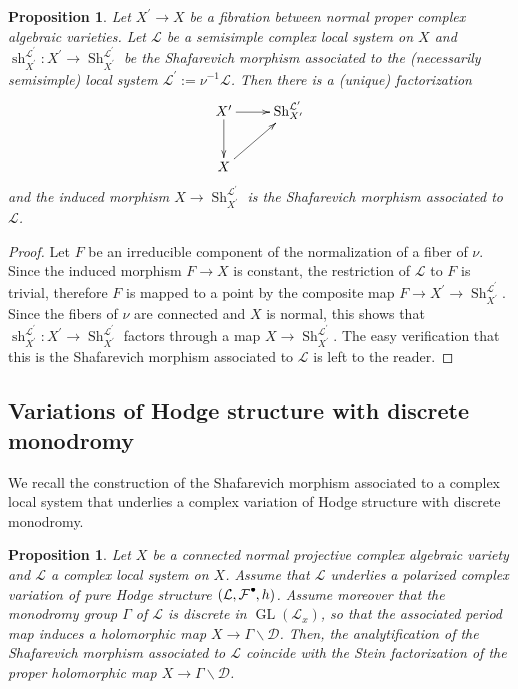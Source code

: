 \documentclass[11pt,letterpaper]{amsart}
\def\cD{\mathcal{D}}
\def\cF{\mathcal{F}}
\def\cL{\mathcal{L}}
\theoremstyle{plain}
\newtheorem{prop}[thm]{Proposition}
\DeclareMathOperator{\GL}{GL}
\DeclareMathOperator{\Sh}{Sh}
\DeclareMathOperator{\sh}{sh}
\newcommand{\sbt}{\,\begin{picture}(-1,1)(-1,-3)\circle*{3}\end{picture}\ }
\begin{document}
\begin{prop}\label{Shafarevich: from smooth to normal}
Let $X^\prime \to X$ be a fibration between normal proper complex algebraic varieties. Let $\cL$ be a semisimple complex local system on $X$ and $\sh_{X^\prime}^{\cL^\prime} \colon X^\prime \rightarrow \Sh_{X^\prime}^{\cL^\prime}$ be the Shafarevich morphism associated to the (necessarily semisimple) local system $ \cL^\prime := \nu^{-1} \cL$. Then there is a (unique) factorization
\begin{align*}
\xymatrix{
X^\prime \ar[r] \ar[d] &  \Sh_{X^\prime}^{\cL^\prime} \\
X   \ar[ru]       &   }
\end{align*}
and the induced morphism $X \rightarrow \Sh_{X^\prime}^{\cL^\prime}$ is the Shafarevich morphism associated to $\cL$.
\end{prop}
\begin{proof}

Let $F$ be an irreducible component of the normalization of a fiber of $\nu$. Since the induced morphism $F \to X$ is constant, the restriction of $\cL$ to $F$ is trivial, therefore $F$ is mapped to a point by the composite map $F \to X^\prime \rightarrow \Sh_{X^\prime}^{\cL^\prime}$. Since the fibers of $\nu$ are connected and $X$ is normal, this shows that $\sh_{X^\prime}^{\cL^\prime} \colon X^\prime \rightarrow \Sh_{X^\prime}^{\cL^\prime}$ factors through a map $X \rightarrow \Sh_{X^\prime}^{\cL^\prime}$. The easy verification that this is the Shafarevich morphism associated to $\cL$ is left to the reader.
\end{proof}


\subsection{Variations of Hodge structure with discrete monodromy}


We recall the construction of the Shafarevich morphism associated to a complex local system that underlies a complex variation of Hodge structure with discrete monodromy.

\begin{prop}\label{Shafarevich map for PVHS}
Let $X$ be a connected normal projective complex algebraic variety and $\cL$ a complex local system on $X$. Assume that $\cL$ underlies a polarized complex variation of pure Hodge structure $(\cL, \cF^{\sbt}, h)$. Assume moreover that the monodromy group $\Gamma$ of $\cL$ is discrete in $\GL(\cL_x)$, so that the associated period map induces a holomorphic map $X \to \Gamma \backslash \cD$. Then, the analytification of the Shafarevich morphism associated to $\cL$ coincide with the Stein factorization of the proper holomorphic map $X \to \Gamma \backslash \cD$.
\end{prop}
\end{document}
